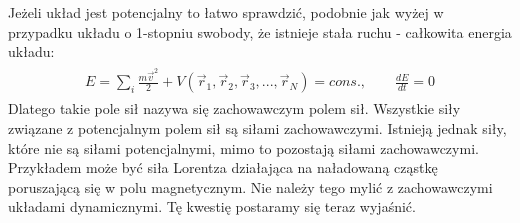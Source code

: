 \documentclass[a4paper,12pt,polish]{sphinxmanual}
\begin{document}
Jeżeli układ jest potencjalny to łatwo sprawdzić, podobnie jak wyżej w przypadku układu o 1-stopniu swobody,  że istnieje stała ruchu - całkowita energia układu:
\label{ch1/chI022:equation-eqn18}\begin{gather}
\begin{split}E = \sum_i \frac{m\vec v^2}{2} + V(\vec r_1,  \vec r_2, \vec r_3, ..., \vec r_N)  = cons., \qquad \frac{dE}{dt} = 0\end{split}\label{ch1/chI022-eqn18}
\end{gather}
Dlatego  takie pole sił nazywa się zachowawczym polem sił.  Wszystkie siły związane z potencjalnym polem sił są siłami zachowawczymi. Istnieją jednak siły, które nie są siłami potencjalnymi, mimo to pozostają siłami zachowawczymi. Przykładem może być siła Lorentza działająca na naładowaną cząstkę poruszającą się w polu magnetycznym. Nie należy tego mylić z zachowawczymi układami dynamicznymi. Tę kwestię postaramy się teraz wyjaśnić.
\end{document}
